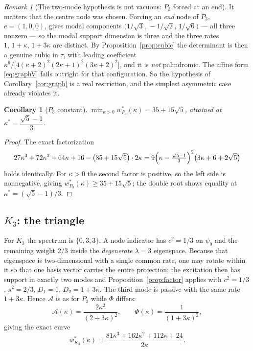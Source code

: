 \documentclass[11pt]{article}
\theoremstyle{plain}
\newtheorem{corollary}[theorem]{Corollary}
\theoremstyle{definition}
\theoremstyle{remark}
\newtheorem{remark}[theorem]{Remark}
\newcommand{\Aco}{\mathcal{A}}
\begin{document}
\begin{remark}[The two-mode hypothesis is not vacuous: $P_3$ forced at an end]\label{rem:P3end}
It matters that the centre node was chosen. Forcing an \emph{end} node of $P_3$,
$e=(1,0,0)$, gives modal components $\bigl(1/\sqrt3,\,-1/\sqrt2,\,1/\sqrt6\bigr)$ --- all three
nonzero --- so the modal support dimension is three and the three rates
$1,\,1+\kappa,\,1+3\kappa$ are distinct. By Proposition~\ref{prop:cubic} the determinant is then
a genuine cubic in $\tau$, with leading coefficient
$\kappa^6/\bigl[4(\kappa+2)^2(2\kappa+1)^2(3\kappa+2)^2\bigr]$, and it is \emph{not} palindromic.
The affine form \eqref{eq:graphV} fails outright for that configuration. So the hypothesis of
Corollary~\ref{cor:graph} is a real restriction, and the simplest asymmetric case already
violates it.
\end{remark}

\begin{corollary}[$P_3$ constant]\label{cor:P3}
$\displaystyle\min_{\kappa>0}w^{*}_{P_3}(\kappa)=35+15\sqrt5$, attained at
$\kappa^{*}=\dfrac{\sqrt5-1}{3}$.
\end{corollary}

\begin{proof}
The exact factorization
\[
  27\kappa^3+72\kappa^2+64\kappa+16-\bigl(35+15\sqrt5\bigr)\cdot2\kappa
  = 9\Bigl(\kappa-\tfrac{\sqrt5-1}{3}\Bigr)^{2}\bigl(3\kappa+6+2\sqrt5\bigr)
\]
holds identically. For $\kappa>0$ the second factor is positive, so the left side is
nonnegative, giving $w^{*}_{P_3}(\kappa)\ge35+15\sqrt5$; the double root shows equality at
$\kappa^{*}=(\sqrt5-1)/3$.
\end{proof}

\subsection{$K_3$: the triangle}\label{sec:K3}

For $K_3$ the spectrum is $\{0,3,3\}$. A node indicator has $c^2=1/3$ on $\psi_0$ and the
remaining weight $2/3$ inside the \emph{degenerate} $\lambda=3$ eigenspace. Because that
eigenspace is two-dimensional with a single common rate, one may rotate within it so that one
basis vector carries the entire projection; the excitation then has support in exactly two modes
and Proposition~\ref{prop:factor} applies with $c^2=1/3$, $s^2=2/3$, $D_1=1$, $D_2=1+3\kappa$.
The third mode is passive with the same rate $1+3\kappa$. Hence $\Aco$ is as for $P_3$ while
$\Phi$ differs:
\[
  \Aco(\kappa)=\frac{2\kappa^2}{(2+3\kappa)^2},
  \qquad
  \Phi(\kappa)=\frac{1}{(1+3\kappa)^2},
\]
giving the exact curve
\begin{equation}
  w^{*}_{K_3}(\kappa)=\frac{81\kappa^3+162\kappa^2+112\kappa+24}{2\kappa}. \label{eq:K3curve}
\end{equation}
\end{document}
